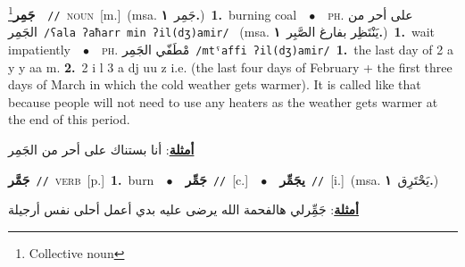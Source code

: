 \documentclass[10pt,a4paper,twoside]{article} %
\begin{document}
\begin{multicols}{2}
{\setlength\topsep{0pt}\textbf{\foreignlanguage{arabic}{جَمِر}}\footnote{Collective noun}\ \ {\color{gray}\texttt{//}\color{black}}\ \textsc{noun}\ [m.]\ \color{gray}(msa. \foreignlanguage{arabic}{جَمِر}~\foreignlanguage{arabic}{\textbf{١.}})\color{black}\ \textbf{1.}~burning coal\ \ $\bullet$\ \ \textsc{ph.} \color{gray} \foreignlanguage{arabic}{على أحر من الجَمِر}\color{black}\ {\color{gray}\texttt{/{\sffamily ʕala ʔaħarr min ʔil(dʒ)amir}/}\color{black}}\ \color{gray} (msa. \foreignlanguage{arabic}{يَنْتَظِر بفارغ الصَّبِر}~\foreignlanguage{arabic}{\textbf{١.}})\color{black}\ \textbf{1.}~wait impatiently\ \ $\bullet$\ \ \textsc{ph.} \color{gray} \foreignlanguage{arabic}{مْطَفّي الجَمِر}\color{black}\ {\color{gray}\texttt{/{\sffamily mtˤaffi ʔil(dʒ)amir}/}\color{black}}\ \textbf{1.}~the last day of 2 a y y aa m.  \textbf{2.}~2 i l 3 a dj uu z i.e. (the last four days of February + the first three days of March in which the cold weather gets warmer). It is called like that because people will not need to use any heaters as the weather gets warmer at the end of this period.\  \begin{flushright}\color{gray}\foreignlanguage{arabic}{\textbf{\underline{\foreignlanguage{arabic}{أمثلة}}}: أنا بستناك على أحر من الجَمِر}\end{flushright}\color{black}} \vspace{2mm}

{\setlength\topsep{0pt}\textbf{\foreignlanguage{arabic}{جَمَّر}}\ {\color{gray}\texttt{//}\color{black}}\ \textsc{verb}\ [p.]\ \textbf{1.}~burn\ \ $\bullet$\ \ \setlength\topsep{0pt}\textbf{\foreignlanguage{arabic}{جَمِّر}}\ {\color{gray}\texttt{//}\color{black}}\ [c.]\ \ $\bullet$\ \ \setlength\topsep{0pt}\textbf{\foreignlanguage{arabic}{يجَمِّر}}\ {\color{gray}\texttt{//}\color{black}}\ [i.]\ \color{gray}(msa. \foreignlanguage{arabic}{يَحْتَرِق}~\foreignlanguage{arabic}{\textbf{١.}})\color{black}\  \begin{flushright}\color{gray}\foreignlanguage{arabic}{\textbf{\underline{\foreignlanguage{arabic}{أمثلة}}}: جَمِِّرلي هالفحمة الله يرضى عليه بدي أعمل أحلى نفس أرجيلة}\end{flushright}\color{black}} \vspace{2mm}


\end{multicols}
\end{document}
